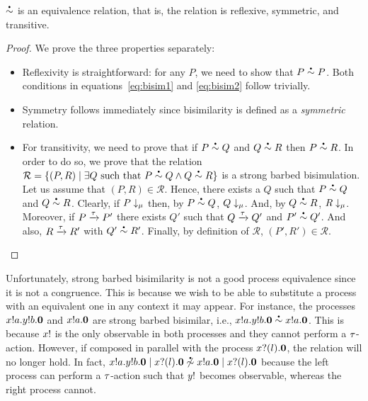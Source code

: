 \begin{theorem}
  \( \sbbisim{}{} \) is an equivalence relation, that is, the relation is reflexive, symmetric, and transitive.
\end{theorem}
\begin{proof}
  We prove the three properties separately: 
  \begin{itemize}
  \item Reflexivity is straightforward: for any $P$, we need to show
    that $P\sbbisim{}{} P$. Both conditions in
    equations~\ref{eq:bisim1} and \ref{eq:bisim2} follow trivially.
  \item Symmetry follows immediately since bisimilarity is defined as
    a {\em symmetric} relation.
  \item For transitivity, we need to prove that if $P\sbbisim{}{} Q$
    and $Q\sbbisim{}{} R$ then $P\sbbisim{}{} R$. In order to do so,
    we prove that the relation
    $\mathcal R=\{(P,R)\mid \exists Q\text{ such that }P\sbbisim{}{} Q
    \land Q\sbbisim{}{} R\}$ is a strong barbed bisimulation. Let us
    assume that $(P,R)\in\mathcal R$. Hence, there exists a $Q$ such
    that $P\sbbisim{}{} Q$ and $Q\sbbisim{}{} R$. Clearly, if
    $P\downarrow_{\mu}$ then, by $P\sbbisim{}{} Q$,
    $Q\downarrow_{\mu}$. And, by $Q\sbbisim{}{} R$,
    $R\downarrow_{\mu}$. Moreover, if $P \xrightarrow{\tau} P'$
    there exists $Q'$ such that $Q \xrightarrow{\tau} Q'$ and
    $P'\sbbisim{}{}Q'$. And also, $R \xrightarrow{\tau} R'$ with
    $Q'\sbbisim{}{}R'$. Finally, by definition of $\mathcal R$,
    $(P',R')\in\mathcal R$.
  \end{itemize}
  
\end{proof}

Unfortunately, strong barbed bisimilarity is not a good process
equivalence since it is not a congruence. This is because we wish to
be able to substitute a process with an equivalent one in any context
it may appear.
For instance, the processes $x ! a . y ! b . \bm{0}$ and
$x ! a . \bm{0}$ are strong barbed bisimilar, i.e.,
$\sbbisim{\Pout{x}{a}{\Pout{y}{b}{\Pend}}}{\Pout{x}{a}{\Pend}}$. This
is because \( x! \) is the only observable in both processes
and they cannot perform a \( \tau \)-action. However, if composed in
parallel with the process $x ? (l) . \bm{0}$, the relation will no
longer hold. In fact,
$\nsbbisim{\Ppar{\Pout{x}{a}{\Pout{y}{b}{\Pend}}}{\Pin{x}{l}{\Pend}}}{\Pout{x}{a}{\Pend}\Ppar{}{\Pin{x}{l}{\Pend}}}$
%
because the left process can perform a \( \tau \)-action such that
\( y! \) becomes observable, whereas the right process cannot.

